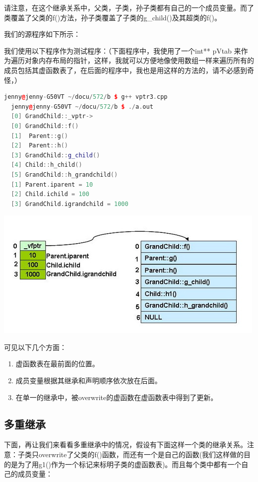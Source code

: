 \documentclass{article}
\begin{document}
\begin{CJK}{UTF8}{gbsn}
请注意，在这个继承关系中，父类，子类，孙子类都有自己的一个成员变量。而了类覆盖了父类的f()方法，孙子类覆盖了子类的g\_child()及其超类的f()。
 
我们的源程序如下所示：

我们使用以下程序作为测试程序：（下面程序中，我使用了一个int** pVtab 来作为遍历对象内存布局的指针，这样，我就可以方便地像使用数组一样来遍历所有的成员包括其虚函数表了，在后面的程序中，我也是用这样的方法的，请不必感到奇怪，）

\begin{lstlisting}[language=c++]
  jenny@jenny-G50VT ~/docu/572/b $ g++ vptr3.cpp
  jenny@jenny-G50VT ~/docu/572/b $ ./a.out
  [0] GrandChild::_vptr->
  [0] GrandChild::f()
  [1]  Parent::g()
  [2]  Parent::h()
  [3] GrandChild::g_child()
  [4] Child::h_child()
  [5] GrandChild::h_grandchild()
  [1] Parent.iparent = 10
  [2] Child.ichild = 100
  [3] GrandChild.igrandchild = 1000
\end{lstlisting}

\includegraphics{mi01.jpg}

可见以下几个方面：
\begin{enumerate}
\item 虚函数表在最前面的位置。
\item 成员变量根据其继承和声明顺序依次放在后面。
\item 在单一的继承中，被overwrite的虚函数在虚函数表中得到了更新。
\end{enumerate}


\subsection{多重继承}

下面，再让我们来看看多重继承中的情况，假设有下面这样一个类的继承关系。注意：子类只overwrite了父类的f()函数，而还有一个是自己的函数(我们这样做的目的是为了用g1()作为一个标记来标明子类的虚函数表)。而且每个类中都有一个自己的成员变量：


\end{CJK}
\end{document}
